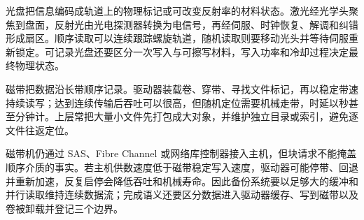 
光盘把信息编码成轨道上的物理标记或可改变反射率的材料状态。激光经光学头聚焦到盘面，反射光由光电探测器转换为电信号，再经伺服、时钟恢复、解调和纠错形成扇区。顺序读取可以连续跟踪螺旋轨道，随机读取则要移动光头并等待伺服重新锁定。可记录光盘还要区分一次写入与可擦写材料，写入功率和冷却过程决定最终物理状态。


磁带把数据沿长带顺序记录。驱动器装载卷、穿带、寻找文件标记，再以稳定带速持续读写；达到连续传输后吞吐可以很高，但随机定位需要机械走带，时延以秒甚至分钟计。上层常把大量小文件先打包成大对象，并维护独立目录或索引，避免逐文件往返定位。

磁带机仍通过 SAS、Fibre Channel 或网络库控制器接入主机，但块请求不能掩盖顺序介质的事实。若主机供数速度低于磁带稳定写入速度，驱动器可能停带、回退并重新加速，反复启停会降低吞吐和机械寿命。因此备份系统要以足够大的缓冲和并行读取维持连续数据流；完成语义还要区分数据进入驱动器缓存、写到磁带以及卷被卸载并登记三个边界。
